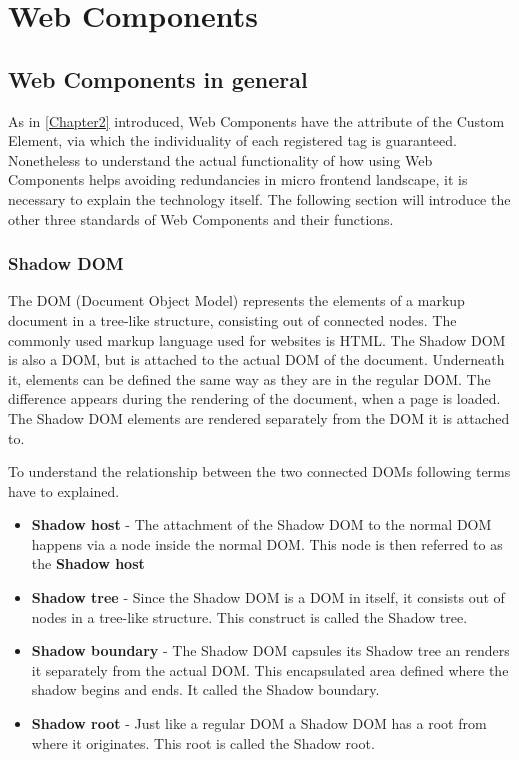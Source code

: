 \chapter{Web Components} %
\label{Chapter4}


\section{Web Components in general}

As in \ref{Chapter2} introduced, Web Components have the attribute of the Custom Element, via which the individuality of each registered tag is guaranteed.
Nonetheless to understand the actual functionality of how using Web Components helps avoiding redundancies in micro frontend landscape, it is necessary to explain the technology itself.
The following section will introduce the other three standards of Web Components and their functions.

\subsection{Shadow DOM}

The DOM (Document Object Model) represents the elements of a markup document in a tree-like structure, consisting out of connected nodes. The commonly used markup language used for websites is HTML. \cite{wc_shadow_dom}
The Shadow DOM is also a DOM, but is attached to the actual DOM of the document. Underneath it, elements can be defined the same way as they are in the regular DOM. The difference appears during the rendering of the document, when a page is loaded. The Shadow DOM elements are rendered separately from the DOM it is attached to.\cite{simon_thesis}

To understand the relationship between the two connected DOMs following terms have to explained.

\begin{itemize}
	\item \textbf{Shadow host} - The attachment of the Shadow DOM to the normal DOM happens via a node inside the normal DOM. This node is then referred to as the \textbf{Shadow host} 
	\item \textbf{Shadow tree} - Since the Shadow DOM is a DOM in itself, it consists out of nodes in a tree-like structure. This construct is called the Shadow tree.
	\item \textbf{Shadow boundary} - The Shadow DOM capsules its Shadow tree an renders it separately from the actual DOM. This encapsulated area defined where the shadow begins and ends. It called the Shadow boundary.  
	\item \textbf{Shadow root} - Just like a regular DOM a Shadow DOM has a root from where it originates. This root is called the Shadow root.
\end{itemize} 


